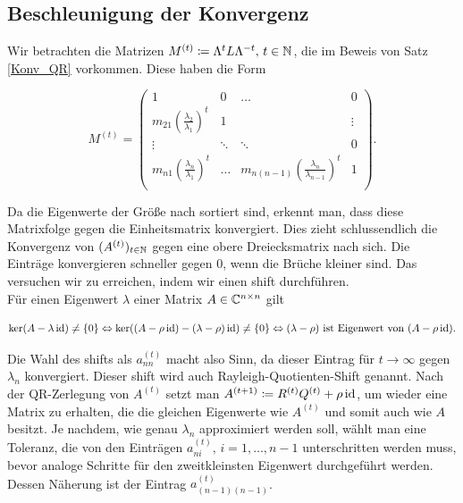 \documentclass{article}
\theoremstyle{plain}
\begin{document}
\subsection{Beschleunigung der Konvergenz}

Wir betrachten die Matrizen $M^{(t)} \coloneqq \Lambda^t L \Lambda^{-t},\, t \in \mathbb{N}$, die im Beweis von Satz \ref{Konv_QR} vorkommen. Diese haben die Form

\begin{equation*}
	M^{(t)} =
	\left( \begin{array}{cccc}
		1 & 0 & \dots & 0 \\
		m_{21} \left(\frac{\lambda_2}{\lambda_1}\right)^t & 1 &  &\vdots \\
		\vdots & \ddots & \ddots & 0 \\
		m_{n1} \left(\frac{\lambda_n}{\lambda_1}\right)^t & \dots & m_{n(n-1)} \left(\frac{\lambda_n}{\lambda_{n-1}}\right)^t & 1 \\
	\end{array}\right).
\end{equation*}

\vspace{4pt}
Da die Eigenwerte der Größe nach sortiert sind, erkennt man, dass diese Matrixfolge gegen die Einheitsmatrix konvergiert. Dies zieht schlussendlich die Konvergenz von $(A^{(t)})_{t\in \mathbb{N}}$ gegen eine obere Dreiecksmatrix nach sich.
Die Einträge konvergieren schneller gegen $0$, wenn die Brüche kleiner sind. Das versuchen wir zu erreichen, indem wir einen shift durchführen.\\
Für einen Eigenwert $\lambda$ einer Matrix $A \in \mathbb{C}^{n\times n}$ gilt

\begin{equation*}
	\ker(A - \lambda \operatorname{id}) \neq \{0\} \Leftrightarrow \ker ((A - \rho \operatorname{id}) - (\lambda -\rho) \operatorname{id}) \neq \{0\} \Leftrightarrow (\lambda-\rho) \text{ ist Eigenwert von }  (A - \rho \operatorname{id}).
\end{equation*}

Die Wahl des shifts als $a^{(t)}_{nn}$ macht also Sinn, da dieser Eintrag für $t \rightarrow \infty$ gegen $\lambda_n$ konvergiert. Dieser shift wird auch Rayleigh-Quotienten-Shift genannt. Nach der QR-Zerlegung von $A^{(t)}$ setzt man $A^{(t+1)} \coloneqq R^{(t)}Q^{(t)} + \rho \operatorname{id}$, um wieder eine Matrix zu erhalten, die die gleichen Eigenwerte wie $A^{(t)}$ und somit auch wie $A$ besitzt.
Je nachdem, wie genau $\lambda_n$ approximiert werden soll, wählt man eine Toleranz, die von den Einträgen $a^{(t)}_{ni}, \, i = 1,\dots, n-1$ unterschritten werden muss, bevor analoge Schritte für den zweitkleinsten Eigenwert durchgeführt werden. Dessen Näherung ist der Eintrag $a^{(t)}_{(n-1)(n-1)}$.
\end{document}
